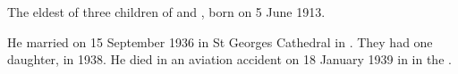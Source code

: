 
The eldest of three children of  and ,
born on 5 June 1913.

He married  on 15 September 1936 in St Georges Cathedral in .\cite{MargPeterMarriage}
They had one daughter, in 1938.\cite{JHBirthNotice}
He died in an aviation accident on 18 January 1939 in  in the .
